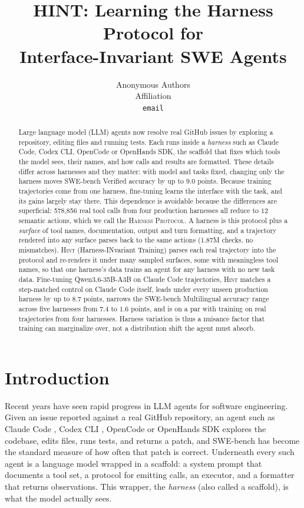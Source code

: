 \documentclass{article} %
\title{HINT: Learning the Harness Protocol for\\
Interface-Invariant SWE Agents}
\author{Anonymous Authors \\
Affiliation \\
\texttt{email}
}
\newcommand{\HP}{\textsc{Harness Protocol}}
\newcommand{\method}{\textsc{Hint}}
\newcommand{\basemodel}{Qwen3.6-35B-A3B}
\newcommand{\swev}{SWE-bench Verified}
\newcommand{\swem}{SWE-bench Multilingual}
\newcommand{\claudecode}{Claude Code}
\newcommand{\opencode}{OpenCode}
\newcommand{\codexcli}{Codex CLI}
\newcommand{\openhands}{OpenHands SDK}   %
\newcommand{\numactions}{578{,}856}       %
\newcommand{\numroundtrip}{1.87M}         %
\begin{document}
\maketitle

\begin{abstract}
Large language model (LLM) agents now resolve real GitHub issues by exploring
a repository, editing files and running tests. Each runs inside a
\emph{harness} such as \claudecode{}, \codexcli{}, \opencode{} or
\openhands{}, the scaffold that fixes which tools the model sees, their
names, and how calls and results are formatted. These details differ across
harnesses and they matter: with model and tasks fixed, changing only the
harness moves \swev{} accuracy by up to $9.0$ points. Because training
trajectories come from one harness, fine-tuning learns the interface with the
task, and its gains largely stay there. This dependence is avoidable because
the differences are superficial: \numactions{} real tool calls from four
production harnesses all reduce to $12$ semantic actions, which we call the
\HP{}. A harness is this protocol plus a \emph{surface} of tool names,
documentation, output and turn formatting, and a trajectory rendered into any
surface parses back to the same actions (\numroundtrip{} checks, no
mismatches). \method{} (Harness-INvariant Training) parses each real
trajectory into the protocol and re-renders it under many sampled surfaces,
some
with meaningless tool names, so that one harness's data trains an agent
for any harness with no new task data.
Fine-tuning \basemodel{} on \claudecode{} trajectories, \method{} matches a
step-matched control on \claudecode{} itself, leads under every unseen
production harness by up to $8.7$ points, narrows the \swem{} accuracy range across five
harnesses from $7.4$ to $1.6$ points, and is on a par with training
on real trajectories from four harnesses. Harness variation is thus a nuisance
factor that training can marginalize over, not a distribution shift the agent
must absorb.
\end{abstract}

\section{Introduction}
\label{sec:intro}

Recent years have seen rapid progress in LLM agents for software engineering.
Given an issue reported against a real GitHub repository, an agent such as
\claudecode{} \citep{anthropic2025claudecode}, \codexcli{}
\citep{openai2025codex}, \opencode{} \citep{opencode2025} or \openhands{}
\citep{wang2025openhandssdk} explores the codebase,
edits files, runs tests, and returns a patch, and SWE-bench
\citep{jimenez2024swebench} has become the standard measure of how often that
patch is correct. Underneath every such agent is a language model wrapped in a
scaffold: a system prompt that documents a tool set, a protocol for emitting
calls, an executor, and a formatter that returns observations. This wrapper, the \emph{harness} (also called a scaffold), is what the model actually sees.
\end{document}
